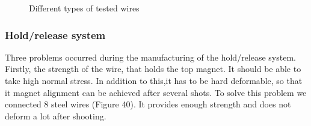 \documentclass{article}
\begin{document}
\begin{figure}[H]
\centering
{}
\caption{Different types of tested wires}
\end{figure}

\subsubsection*{Hold/release system}
Three problems occurred during the manufacturing of the hold/release system. Firstly, the strength of the wire, that holds the top magnet. It should be able to take high normal stress. In addition to this,it has to be hard deformable, so that it magnet alignment can be achieved after several shots. To solve this problem we connected 8 steel wires (Figure 40). It provides enough strength and does not deform a lot after shooting.
\end{document}
